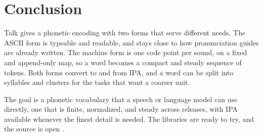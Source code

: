 \section{Conclusion}

Talk gives a phonetic encoding with two forms that serve different needs. The ASCII form is typeable and readable, and stays close to how pronunciation guides are already written. The machine form is one code point per sound, on a fixed and append-only map, so a word becomes a compact and steady sequence of tokens. Both forms convert to and from IPA, and a word can be split into syllables and clusters for the tasks that want a coarser unit.

The goal is a phonetic vocabulary that a speech or language model can use directly, one that is finite, normalized, and steady across releases, with IPA available whenever the finest detail is needed. The libraries are ready to try, and the source is open \cite{cluesurf2026talk}.
